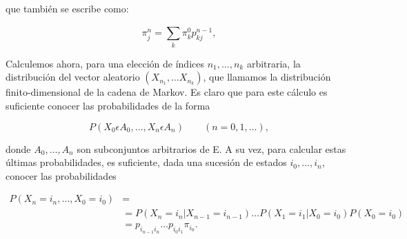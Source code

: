 		que tambi\'{e}n se escribe como:
		
		\begin{equation}
			\pi_{ j }^{ n }=\sum _{ k }^{  }{\pi^{0}_{ k }p_{ kj }^{ n-1 } } , \label{2.13}
		\end{equation}
		
		Calculemos ahora, para una elecci\'{o}n de \'{i}ndices ${ n }_{ 1 },\ldots ,{ n }_{ k }$ arbitraria, la distribuci\'{o}n del vector aleatorio $( X_{ { n }_{ 1 } },\ldots  X_{ { n }_{ k } })$, que llamamos la distribuci\'{o}n finito-dimensional de la cadena de Markov. Es claro que para este c\'{a}lculo es suficiente conocer las probabilidades de la forma 
		
		\begin{equation}
			P( X_{ 0 }\epsilon { A }_{ 0 },\ldots , X_{ n }\epsilon { A }_{ n })\quad \quad (n=0,1,\ldots ), \nonumber
		\end{equation}
		
		donde ${ A }_{ 0 },\ldots ,{ A }_{ n }$ son subconjuntos arbitrarios de E. A su vez, para calcular estas \'{u}ltimas probabilidades, es suficiente, dada una sucesi\'{o}n de estados ${ i }_{ 0 },\ldots ,{ i }_{ n }$, conocer las probabilidades
		
		\begin{align}
			P( X_{ n } ={ i }_{ n },\ldots , X_{ 0 }={ i }_{ 0 }) & = \nonumber \\
			& =P( X_{ n }={ i }_{ n }| X_{ n-1 }={ i }_{ n-1 })\ldots P( X_{ 1 }={ i }_{ 1 }| X_{ 0 }={ i }_{ 0 })P( X_{ 0 }={ i }_{ 0 }) \nonumber \\ 
			&=p_{ { i }_{ n-1 }{ i }_{ n } }\ldots p_{ { i }_{ 0 }{ i }_{ 1 } }{ \pi  }_{ { i }_{ 0 } } .\label{2.14} 
		\end{align}
		

